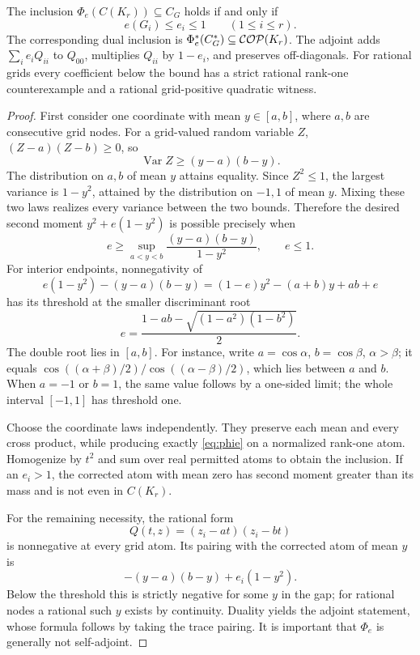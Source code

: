 \begin{theorem}\label{thm:angular}
The inclusion $\Phi_e(C(K_r))\subseteq C_G$ holds if and only if
\[
 e(G_i)\le e_i\le1\qquad(1\le i\le r).
\]
The corresponding dual inclusion is $\Phi_e^*(C_G^*)\subseteq\mathcal{COP}(K_r)$. The adjoint adds $\sum_i e_iQ_{ii}$ to $Q_{00}$, multiplies $Q_{ii}$ by $1-e_i$, and preserves off-diagonals. For rational grids every coefficient below the bound has a strict rational rank-one counterexample and a rational grid-positive quadratic witness.
\end{theorem}
\begin{proof}
First consider one coordinate with mean $y\in[a,b]$, where $a,b$ are consecutive grid nodes. For a grid-valued random variable $Z$, $(Z-a)(Z-b)\ge0$, so
\[
 \operatorname{Var}Z\ge(y-a)(b-y).
\]
The distribution on $a,b$ of mean $y$ attains equality. Since $Z^2\le1$, the largest variance is $1-y^2$, attained by the distribution on $-1,1$ of mean $y$. Mixing these two laws realizes every variance between the two bounds. Therefore the desired second moment $y^2+e(1-y^2)$ is possible precisely when
\[
 e\ge\sup_{a<y<b}\frac{(y-a)(b-y)}{1-y^2},\qquad e\le1.
\]
For interior endpoints, nonnegativity of
\[
 e(1-y^2)-(y-a)(b-y)=(1-e)y^2-(a+b)y+ab+e
\]
has its threshold at the smaller discriminant root
\[
 e=\frac{1-ab-\sqrt{(1-a^2)(1-b^2)}}2.
\]
The double root lies in $[a,b]$. For instance, write $a=\cos\alpha$, $b=\cos\beta$, $\alpha>\beta$; it equals $\cos((\alpha+\beta)/2)/\cos((\alpha-\beta)/2)$, which lies between $a$ and $b$. When $a=-1$ or $b=1$, the same value follows by a one-sided limit; the whole interval $[-1,1]$ has threshold one.

Choose the coordinate laws independently. They preserve each mean and every cross product, while producing exactly \eqref{eq:phie} on a normalized rank-one atom. Homogenize by $t^2$ and sum over real permitted atoms to obtain the inclusion. If an $e_i>1$, the corrected atom with mean zero has second moment greater than its mass and is not even in $C(K_r)$.

For the remaining necessity, the rational form
\[
 Q(t,z)=(z_i-at)(z_i-bt)
\]
is nonnegative at every grid atom. Its pairing with the corrected atom of mean $y$ is
\[
 -(y-a)(b-y)+e_i(1-y^2).
\]
Below the threshold this is strictly negative for some $y$ in the gap; for rational nodes a rational such $y$ exists by continuity. Duality yields the adjoint statement, whose formula follows by taking the trace pairing. It is important that $\Phi_e$ is generally not self-adjoint.
\end{proof}

